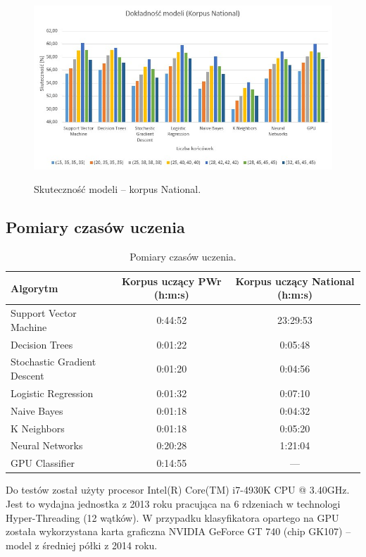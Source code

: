\begin{figure}[H]
	\centering
	\includegraphics[width=\linewidth]{charts/korpusnationalwykres}
	\label{Rysunek}
	\caption{Skuteczność modeli -- korpus National.}
\end{figure}

\newpage
\subsection{Pomiary czasów uczenia}

\begin{table}[H]
	\centering
	\caption{Pomiary czasów uczenia.}
	\smallskip
	\begin{tabular}{lcc}
		\toprule
		\textbf{Algorytm} & \textbf{Korpus uczący PWr (h:m:s)} &  \textbf{Korpus uczący National (h:m:s)} \\
		\midrule
		Support Vector Machine & 0:44:52 & 23:29:53 \\
		Decision Trees & 0:01:22 & 0:05:48 \\
		Stochastic Gradient Descent & 0:01:20 & 0:04:56 \\
		Logistic Regression & 0:01:32 & 0:07:10 \\
		Naive Bayes & 0:01:18 & 0:04:32 \\
		K Neighbors & 0:01:18 & 0:05:20 \\
		Neural Networks & 0:20:28 & 1:21:04 \\
		GPU Classifier & 0:14:55 & --- \\
		\bottomrule
	\end{tabular}
\end{table}
Do testów został użyty procesor Intel(R) Core(TM) i7-4930K CPU @ 3.40GHz. Jest to wydajna jednostka z 2013 roku pracująca na 6 rdzeniach w technologi Hyper-Threading (12 wątków).
W przypadku klasyfikatora opartego na GPU została wykorzystana karta graficzna NVIDIA GeForce GT 740 (chip GK107) -- model z średniej półki z 2014 roku.

